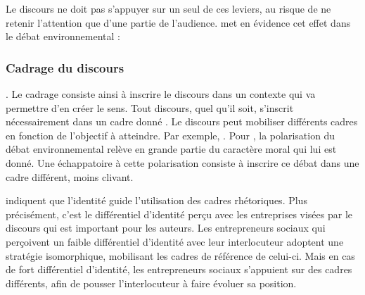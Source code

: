             Le discours ne doit pas s'appuyer sur un seul de ces leviers, au risque de ne retenir l'attention que d'une partie de l'audience. \textcite[][p.14]{nisbet2009communicating} met en évidence cet effet dans le débat environnemental :
            \begin{quotation}
            \end{quotation}

        \subsubsection{Cadrage du discours}
             \parencite[][p.15]{nisbet2009communicating}. Le cadrage consiste ainsi à inscrire le discours dans un contexte qui va permettre d'en créer le sens. Tout discours, quel qu'il soit, s'inscrit nécessairement dans un cadre donné \parencite{nisbet2009communicating}. Le discours peut mobiliser différents cadres en fonction de l'objectif à atteindre. Par exemple,  \parencite[][p.598]{mcgregor2004sustainable}. Pour \textcite{feinberg2013moral}, la polarisation du débat environnemental relève en grande partie du caractère moral qui lui est donné. Une échappatoire à cette polarisation consiste à inscrire ce débat dans une cadre différent, moins clivant.

            \textcite{waldron2016how} indiquent que l'identité guide l'utilisation des cadres rhétoriques. Plus précisément, c'est le différentiel d'identité perçu avec les entreprises visées par le discours qui est important pour les auteurs. Les entrepreneurs sociaux qui perçoivent un faible différentiel d'identité avec leur interlocuteur adoptent une stratégie isomorphique, mobilisant les cadres de référence de celui-ci. Mais en cas de fort différentiel d'identité, les entrepreneurs sociaux s'appuient sur des cadres différents, afin de pousser l'interlocuteur à faire évoluer sa position. \\


